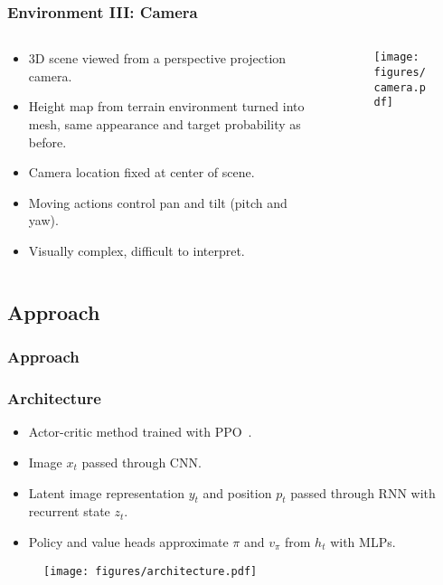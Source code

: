 \begin{frame}
    \frametitle{Environment III: Camera}
    \begin{columns}
        \begin{column}{0.5\textwidth}
            \begin{itemize}
                \item 3D scene viewed from a perspective projection camera.
                \item Height map from terrain environment turned into mesh, same appearance and target probability as before.
                \item Camera location fixed at center of scene.
                \item Moving actions control pan and tilt (pitch and yaw).
                \item Visually complex, difficult to interpret.
            \end{itemize}
        \end{column}
        \begin{column}{0.5\textwidth}
            \begin{figure}
                \centering
                \texttt{[image: figures/camera.pdf]}
            \end{figure}
        \end{column}
    \end{columns}
\end{frame}

\subsection{Approach}

\begin{frame}
    \frametitle{Approach}
\end{frame}

\begin{frame}
    \frametitle{Architecture}

    \begin{itemize}
        \item Actor-critic method trained with PPO~\cite{schulman_proximal_2017}.
        \item Image \(x_t\) passed through CNN.
        \item Latent image representation \(y_t\) and position \(p_t\) passed through RNN with recurrent state \(z_t\).
        \item Policy and value heads approximate \(\pi\) and \(v_\pi\) from \(h_t\) with MLPs.
    \end{itemize}

    \begin{figure}
        \centering
        \texttt{[image: figures/architecture.pdf]}
    \end{figure}
\end{frame}

